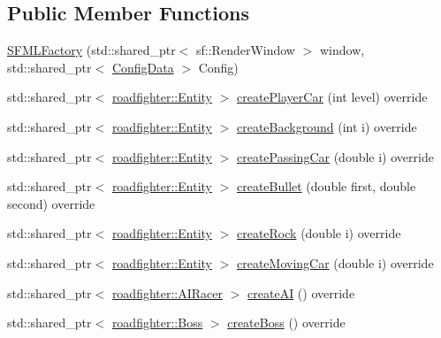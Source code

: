 \subsection*{Public Member Functions}
\begin{DoxyCompactItemize}
\item 
\hyperlink{classroadfighterSFML_1_1SFMLFactory_af39bfa15dc13886b0fa9096baa273377}{S\+F\+M\+L\+Factory} (std\+::shared\+\_\+ptr$<$ sf\+::\+Render\+Window $>$ window, std\+::shared\+\_\+ptr$<$ \hyperlink{classConfigData}{Config\+Data} $>$ Config)
\item 
std\+::shared\+\_\+ptr$<$ \hyperlink{classroadfighter_1_1Entity}{roadfighter\+::\+Entity} $>$ \hyperlink{classroadfighterSFML_1_1SFMLFactory_acb966ae41ef0a928c4adc34b4c97cedb}{create\+Player\+Car} (int level) override
\item 
std\+::shared\+\_\+ptr$<$ \hyperlink{classroadfighter_1_1Entity}{roadfighter\+::\+Entity} $>$ \hyperlink{classroadfighterSFML_1_1SFMLFactory_a18a78a7113edf49647f727105329f605}{create\+Background} (int i) override
\item 
std\+::shared\+\_\+ptr$<$ \hyperlink{classroadfighter_1_1Entity}{roadfighter\+::\+Entity} $>$ \hyperlink{classroadfighterSFML_1_1SFMLFactory_a9960aec21f58babf83857cc400dad8fe}{create\+Passing\+Car} (double i) override
\item 
std\+::shared\+\_\+ptr$<$ \hyperlink{classroadfighter_1_1Entity}{roadfighter\+::\+Entity} $>$ \hyperlink{classroadfighterSFML_1_1SFMLFactory_aac2ed62453b201da7d124947b6cd475b}{create\+Bullet} (double first, double second) override
\item 
std\+::shared\+\_\+ptr$<$ \hyperlink{classroadfighter_1_1Entity}{roadfighter\+::\+Entity} $>$ \hyperlink{classroadfighterSFML_1_1SFMLFactory_ace05bdfcf9fc4f1ca7b9fc6f840b7a12}{create\+Rock} (double i) override
\item 
std\+::shared\+\_\+ptr$<$ \hyperlink{classroadfighter_1_1Entity}{roadfighter\+::\+Entity} $>$ \hyperlink{classroadfighterSFML_1_1SFMLFactory_aa1aeba2d2613b784d9da5f6fd3109154}{create\+Moving\+Car} (double i) override
\item 
std\+::shared\+\_\+ptr$<$ \hyperlink{classroadfighter_1_1AIRacer}{roadfighter\+::\+A\+I\+Racer} $>$ \hyperlink{classroadfighterSFML_1_1SFMLFactory_a977a002d878172e485bea8679c136d76}{create\+AI} () override
\item 
std\+::shared\+\_\+ptr$<$ \hyperlink{classroadfighter_1_1Boss}{roadfighter\+::\+Boss} $>$ \hyperlink{classroadfighterSFML_1_1SFMLFactory_a86f4fed282eebc1556ed1134e7ad7e13}{create\+Boss} () override
\end{DoxyCompactItemize}


